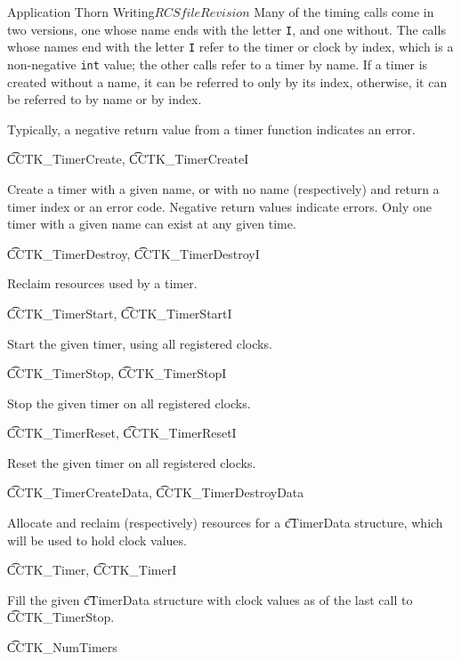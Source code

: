 \begin{cactuspart}{Application Thorn Writing}{$RCSfile$}{$Revision$}
Many of the timing calls come in two versions, one whose name ends with 
the letter \texttt{I}, and one without.  The calls whose names end with the 
letter \texttt{I} refer to the timer or clock by index, which is a
non-negative \texttt{int} value; the other calls refer to a timer by name. 
If a timer is created without a name, it can be referred to only by its index,
otherwise, it can be referred to by name or by index.

Typically, a negative return value from a timer function indicates an error.

\begin{Lentry}

\item[{\t CCTK\_TimerCreate}, {\t CCTK\_TimerCreateI}]

Create a timer with a given name, or with no name (respectively)
and return a timer index or an error code.
Negative return values indicate errors. 
Only one timer with a given name can exist at any given time.

\item[{\t CCTK\_TimerDestroy}, {\t CCTK\_TimerDestroyI}]

Reclaim resources used by a timer.

\item[{\t CCTK\_TimerStart}, {\t CCTK\_TimerStartI}]

Start the given timer, using all registered clocks.

\item[{\t CCTK\_TimerStop}, {\t CCTK\_TimerStopI}]

Stop the given timer on all registered clocks.

\item[{\t CCTK\_TimerReset}, {\t CCTK\_TimerResetI}]

Reset the given timer on all registered clocks.

\item[{\t CCTK\_TimerCreateData}, {\t CCTK\_TimerDestroyData}]

Allocate and reclaim (respectively) resources for a {\t cTimerData} structure,
which will be used to hold clock values.

\item[{\t CCTK\_Timer}, {\t CCTK\_TimerI}]

Fill the given {\t cTimerData} structure with clock values as of
the last call to {\t CCTK\_TimerStop}.

\item[{\t CCTK\_NumTimers}]


\end{Lentry}
\end{cactuspart}
